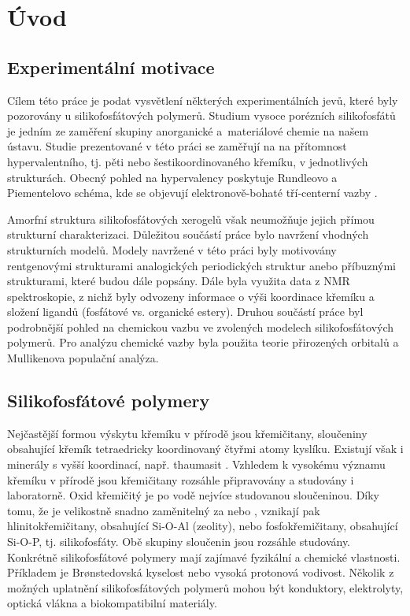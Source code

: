 \documentclass[
  digital, %
  table,   %
  lof,     %
  lot,     %
  oneside,
]{fithesis3}
\begin{document}
\chapter{Úvod}


\section{Experimentální motivace}
Cílem této práce je podat vysvětlení některých experimentálních jevů, které byly pozorovány u silikofosfátových polymerů. Studium vysoce porézních silikofosfátů je jedním ze zaměření skupiny anorganické a~materiálové chemie na našem ústavu. Studie prezentované v této práci se zaměřují na na přítomnost hypervalentního, tj. pěti nebo šestikoordinovaného křemíku, v jednotlivých strukturách. Obecný pohled na hypervalency poskytuje Rundleovo a Piementelovo schéma, kde se objevují elektronově-bohaté tří-centerní vazby \cite{405827} \cite{Munzarova2001}.

Amorfní struktura silikofosfátových xerogelů však neumožňuje jejich přímou strukturní charakterizaci. Důležitou součástí práce bylo navržení vhodných strukturních modelů. Modely navržené v této práci byly motivovány rentgenovými strukturami analogických periodických struktur \cite{C3NJ00721A} \cite{C4TA06823H} anebo příbuznými strukturami, které budou dále popsány. Dále byla využita data z NMR spektroskopie, z nichž byly odvozeny informace o výši koordinace křemíku a složení ligandů (fosfátové vs. organické estery)\cite{Styskalik2015thesis}. Druhou součástí práce byl podrobnější pohled na chemickou vazbu ve zvolených modelech silikofosfátových polymerů. Pro analýzu chemické vazby byla použita teorie přirozených orbitalů a Mullikenova populační analýza.

\section{Silikofosfátové polymery}
Nejčastější formou výskytu křemíku v přírodě jsou křemičitany, sloučeniny obsahující křemík tetraedricky koordinovaný čtyřmi atomy kyslíku. Existují však i minerály s vyšší koordinací, např. thaumasit \cite{Edge:a08100}. Vzhledem k vysokému významu křemíku v přírodě jsou křemičitany rozsáhle připravovány a studovány i laboratorně. Oxid křemičitý  je po vodě nejvíce studovanou sloučeninou. Díky tomu, že  je velikostně snadno zaměnitelný za  nebo , vznikají pak hlinitokřemičitany, obsahující Si-O-Al (zeolity), nebo fosfokřemičitany, obsahující Si-O-P, tj. silikofosfáty. Obě skupiny sloučenin jsou rozsáhle studovány. Konkrétně silikofosfátové polymery mají zajímavé fyzikální a chemické vlastnosti. Příkladem je Brønstedovská kyselost nebo vysoká protonová vodivost. Několik z možných uplatnění silikofosfátových polymerů mohou být konduktory, elektrolyty, optická vlákna a biokompatibilní materiály.\\
\end{document}
